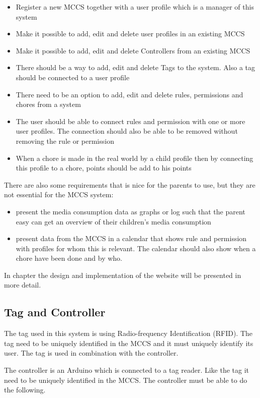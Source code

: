 \begin{itemize}
	\item Register a new MCCS together with a user profile which is a manager of this system
	\item Make it possible to add, edit and delete user profiles in an existing MCCS 
	\item Make it possible to add, edit and delete Controllers from an existing MCCS
	\item There should be a way to add, edit and delete Tags to the system. Also a tag should be connected to a user profile
	\item There need to be an option to add, edit and delete rules, permissions and chores from a system
	\item The user should be able to connect rules and permission with one or more user profiles. The connection should also be able to be removed without removing the rule or permission
	\item When a chore is made in the real world by a child profile then by connecting this profile to a chore, points should be add to his points
\end{itemize}

There are also some requirements that is nice for the parents to use, but they are not essential for the MCCS system:

\begin{itemize}
	\item present the media consumption data as graphs or log such that the parent easy can get an overview of their children's media consumption 
	\item present data from the MCCS in a calendar that shows rule and permission with profiles for whom this is relevant. The calendar should also show when a chore have been done and by who.
\end{itemize}

In chapter  the design and implementation of the website will be presented in more detail. 
 

\subsection{Tag and Controller}
The tag used in this system is using Radio-frequency Identification (RFID). The tag need to be uniquely identified in the MCCS and it must uniquely identify its user. The tag is used in combination with the controller.

The controller is an Arduino which is connected to a tag reader. Like the tag it need to be uniquely identified in the MCCS. The controller must be able to do the following.

